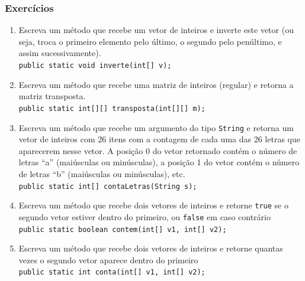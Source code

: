\documentclass[xcolor={dvipsnames,table},aspectratio=169]{beamer}
\begin{document}
\begin{frame}[fragile]\frametitle{Exercícios}
\begin{enumerate}
	\scriptsize
	\item Escreva um método que recebe um vetor de inteiros e inverte este vetor (ou seja, troca o primeiro elemento pelo último, o segundo pelo penúltimo, e assim sucessivamente).\\\texttt{public static void inverte(int[] v);}
	\item Escreva um método que recebe uma matriz de inteiros (regular) e retorna a matriz transposta.\\\texttt{public static int[][] transposta(int[][] m);}
	\item Escreva um método que recebe um argumento do tipo \texttt{String} e retorna um vetor de inteiros com 26 itens com a contagem de cada uma das 26 letras que aparecerem nesse vetor. A posição 0 do vetor retornado contém o número de letras ``a'' (maiúsculas ou minúsculas), a posição 1 do vetor contém o número de letras ``b'' (maiúsculas ou minúsculas), etc.\\\texttt{public static int[] contaLetras(String s);}
	\item Escreva um método que recebe dois vetores de inteiros e retorne \texttt{true} se o segundo vetor estiver dentro do primeiro, ou \texttt{false} em caso contrário\\\texttt{public static boolean contem(int[] v1, int[] v2);}
	\item Escreva um método que recebe dois vetores de inteiros e retorne quantas vezes o segundo vetor aparece dentro do primeiro\\\texttt{public static int conta(int[] v1, int[] v2);}
\end{enumerate}		
\end{frame}
\end{document}

